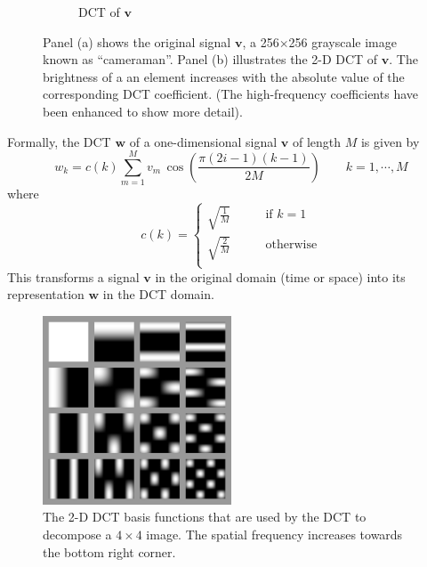 \begin{figure}
\begin{subfigure}{0.45\textwidth}
    \caption{DCT of $\bm v$}
  \end{subfigure}
  \caption[Two-dimensional DCT applied to a digital image]{Panel (a) shows the original signal $\bm v$, a 256$\times$256 grayscale image known as ``cameraman''. Panel (b) illustrates the 2-D DCT of $\bm v$. The brightness of a an element increases with the absolute value of the corresponding DCT coefficient. (The high-frequency coefficients have been enhanced to show more detail).}
  \label{fig:ch3:dct}
\end{figure}

Formally, the DCT $\bm w$ of a one-dimensional signal $\bm v$ of length $M$ is given by
\begin{equation}
  \label{eqn:dct_basis}
  w_k = c(k) \sum_{m=1}^{M} v_m \, \cos\left(\frac{\pi(2i-1)(k-1)}{2M}\right) \qquad k = 1,\cdots,M
\end{equation}
where
\begin{equation*}
  c(k) = \left\{\begin{array}{ll}
  \sqrt{\frac{1}{M}} & \qquad\mbox{if $k=1$}\\
  \sqrt{\frac{2}{M}} & \qquad\mbox{otherwise}\\
  \end{array}\right.
\end{equation*}
This transforms a signal $\bm v$ in the original domain (time or space) into its representation $\bm w$ in the DCT domain.

\begin{figure}
  \centering
  \includegraphics[width=0.5\textwidth]{Chapter3/Images/dct2functions.png}
  \caption[The 2-D DCT basis functions]{The 2-D DCT basis functions that are used by the DCT to decompose a $4\times 4$ image. 
    The spatial frequency increases towards the bottom right corner.}
  \label{fig:2D-DCT}
\end{figure}

